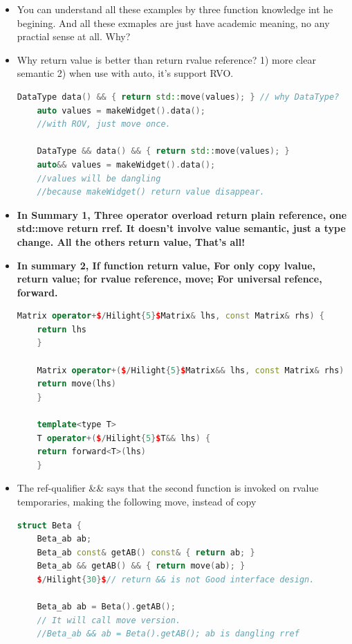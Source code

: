 \documentclass[a4paper,12pt,twoside]{book}
\begin{document}
\begin{itemize}
	
	\item You can understand all these examples by three function knowledge int he begining. And all these exmaples are just have academic meaning, no any practial sense at all. Why?

	
	\item Why return value is better than return rvalue reference? 1) more clear semantic 2) when use with auto, it's support RVO. 
\begin{lstlisting}[frame=single, language=c++]
	DataType data() && { return std::move(values); } // why DataType?
	auto values = makeWidget().data();
	//with ROV, just move once. 
	
	DataType && data() && { return std::move(values); }
	auto&& values = makeWidget().data();
	//values will be dangling
	//because makeWidget() return value disappear.
\end{lstlisting}
	
	
	\item \textbf{In Summary 1, Three operator overload return plain reference, one std::move return rref. It doesn't involve value semantic, just a type change. All the others return value, That's all!}
	
	\item \textbf{In summary 2, If function return value, For only copy lvalue, return value; for rvalue reference, move;  For universal refence, forward. }
	
	\begin{lstlisting}[frame=single, language=c++,mathescape=true]
	Matrix operator+$/Hilight{5}$Matrix& lhs, const Matrix& rhs) {
	return lhs
	}
	
	Matrix operator+($/Hilight{5}$Matrix&& lhs, const Matrix& rhs) {
	return move(lhs)
	}
	
	template<type T>
	T operator+($/Hilight{5}$T&& lhs) {
	return forward<T>(lhs)
	}
	\end{lstlisting}
	
	\item The ref-qualifier \&\& says that the second function is invoked on rvalue temporaries, making the following move, instead of copy
	
\begin{lstlisting}[frame=single, language=c++,mathescape=true]
	struct Beta {
	Beta_ab ab;
	Beta_ab const& getAB() const& { return ab; }
	Beta_ab && getAB() && { return move(ab); }
	$/Hilight{30}$// return && is not Good interface design.
	
	Beta_ab ab = Beta().getAB();
	// It will call move version.
	//Beta_ab && ab = Beta().getAB(); ab is dangling rref
	

\end{lstlisting}
\end{itemize}
\end{document}
